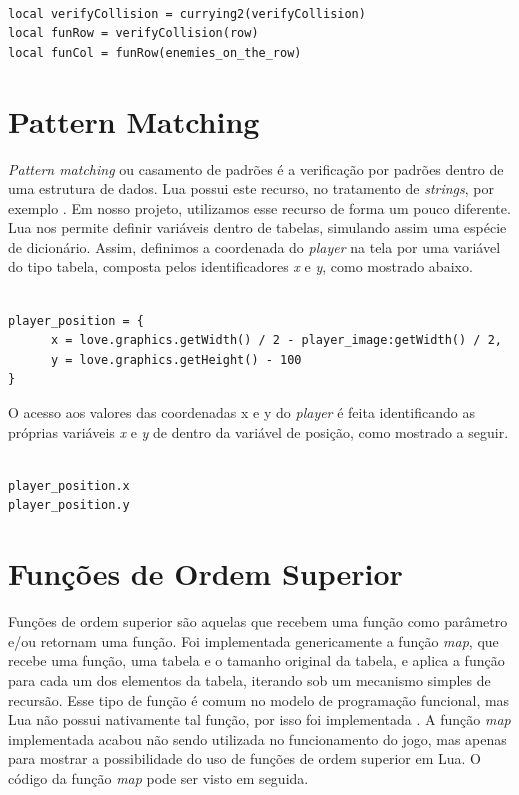 \documentclass[rel_mlp]{iiufrgs}
\begin{document}
\begin{lstlisting}

local verifyCollision = currying2(verifyCollision)
local funRow = verifyCollision(row)
local funCol = funRow(enemies_on_the_row)

\end{lstlisting}

\section{Pattern Matching}

\textit{Pattern matching} ou casamento de padrões é a verificação por padrões dentro de uma estrutura de dados. Lua possui este recurso, no tratamento de \textit{strings}, por exemplo \cite{PatternMatchingLua}. Em nosso projeto, utilizamos esse recurso de forma um pouco diferente. Lua nos permite definir variáveis dentro de tabelas, simulando assim uma espécie de dicionário. Assim, definimos a coordenada do \textit{player} na tela por uma variável do tipo tabela, composta pelos identificadores \textit{x} e \textit{y}, como mostrado abaixo.

\begin{lstlisting}

player_position = {
      x = love.graphics.getWidth() / 2 - player_image:getWidth() / 2,
      y = love.graphics.getHeight() - 100
}

\end{lstlisting}

O acesso aos valores das coordenadas x e y do \textit{player} é feita identificando as próprias variáveis \textit{x} e \textit{y} de dentro da variável de posição, como mostrado a seguir.

\begin{lstlisting}

player_position.x
player_position.y

\end{lstlisting}



\section{Funções de Ordem Superior}

Funções de ordem superior são aquelas que recebem uma função como parâmetro e/ou retornam uma função. Foi implementada genericamente a função \textit{map}, que recebe uma função, uma tabela e o tamanho original da tabela, e aplica a função para cada um dos elementos da tabela, iterando sob um mecanismo simples de recursão. Esse tipo de função é comum no modelo de programação funcional, mas Lua não possui nativamente tal função, por isso foi implementada \cite{HigherOrderFunctionLua}. A função \textit{map} implementada acabou não sendo utilizada no funcionamento do jogo, mas apenas para mostrar a possibilidade do uso de funções de ordem superior em Lua. O código da função \textit{map} pode ser visto em seguida.
\end{document}
